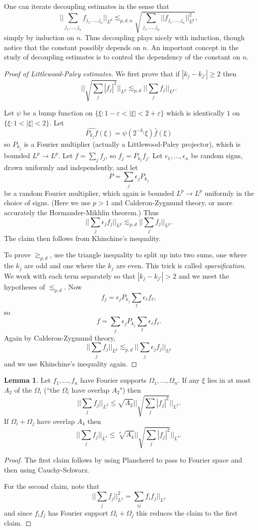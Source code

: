 \documentclass[12pt]{report}
\newcommand{\dfn}[1]{\emph{#1}\index{#1}}
\theoremstyle{definition}
\newtheorem{lemma}[theorem]{Lemma}
\begin{document}
One can iterate decoupling estimates in the sense that
$$||\sum_{j_1, \dots, j_n} f_{j_1, \dots, j_n}||_{L^p} \lesssim_{p, d, n} \sqrt{\sum_{j_1, \dots, j_n} ||f_{j_1, \dots, j_n}||_{L^p}^2},$$
simply by induction on $n$. Thus decoupling plays nicely with induction, though notice that the constant possibly depends on $n$.
An important concept in the study of decoupling estimates is to control the dependency of the constant on $n$.

\begin{proof}[Proof of Littlewood-Paley estimates]
We first prove that if $|k_j - k_{j'}| \geq 2$ then
$$||\sqrt{\sum_j |f_j|^2}||_{L^p} \lesssim_{p,d} ||\sum_j f_j||_{L^p}.$$

Let $\psi$ be a bump function on $\{\xi: 1-\varepsilon < |\xi| < 2 + \varepsilon\}$ which is identically $1$ on $\{\xi: 1 < |\xi| < 2\}$.
Let
$$\widehat{P_{k_j}f}(\xi) = \psi(2^{-k_j}\xi)\hat f(\xi)$$
so $P_{k_j}$ is a Fourier multiplier (actually a Littlewood-Paley projector), which is bounded $L^p \to L^p$.
Let $f = \sum_j f_j$, so $f_j = P_{k_j}f_j$.
Let $\epsilon_1, \dots, \epsilon_n$ be random signs, drawn uniformly and independently, and let
$$P = \sum_j \epsilon_j P_{k_j}$$
be a random Fourier multiplier, which again is bounded $L^p \to L^p$ uniformly in the choice of signs. (Here we use $p > 1$ and Calderon-Zygmund theory, or more accurately the Hormander-Mikhlin theorem.) Thus
$$||\sum_j \epsilon_j f_j||_{L^p} \lesssim_{p,d} ||\sum_j f_j||_{L^p}.$$
The claim then follows from Khinchine's inequality.

To prove $\gtrsim_{p, d}$, use the triangle inequality to split up into two sums, one where the $k_j$ are odd and one where the $k_j$ are even.
This trick is called \dfn{sparsification}. We work with each term separately so that $|k_j - k_{j'}| > 2$ and we meet the hypotheses of $\lesssim_{p, d}$.
Now
$$f_j = \epsilon_j P_{k_j} \sum_\ell \epsilon_\ell f_\ell,$$
so
$$f = \sum_j \epsilon_j P_{k_j} \sum_\ell \epsilon_\ell f_\ell.$$
Again by Calderon-Zygmund theory,
$$||\sum_j f_j||_{L^p} \lesssim_{p, d} ||\sum_j \epsilon_j f_j||_{L^p}$$
and we use Khinchine's inequality again.
\end{proof}

\begin{lemma}
Let $f_1, \dots, f_n$ have Fourier supports $\Omega_1, \dots, \Omega_n$.
If any $\xi$ lies in at most $A_2$ of the $\Omega_i$ (``the $\Omega_i$ have overlap $A_2$") then
$$||\sum_j f_j||_{L^2} \leq \sqrt{A_2} ||\sqrt{\sum_j |f_j|^2}||_{L^2}.$$
If $\Omega_i + \Omega_j$ have overlap $A_4$ then
$$||\sum_j f_j||_{L^4} \leq \sqrt[4]{A_4} ||\sqrt{\sum_j |f_j|^2}||_{L^4}.$$
\end{lemma}
\begin{proof}
The first claim follows by using Plancherel to pass to Fourier space and then using Cauchy-Schwarz.

For the second claim, note that
$$||\sum_j f_j||_{L^4}^2 = \sum_{ij} f_if_j||_{L^2}$$
and since $f_if_j$ has Fourier support $\Omega_i + \Omega_j$ this reduces the claim to the first claim.
\end{proof}
\end{document}

